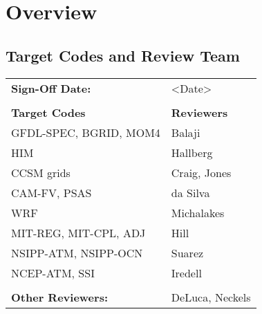 \chapter{\longname Overview}

\section{Target Codes and Review Team}

\begin{tabular}{l l}

{\bf Sign-Off Date:}          & <Date> \\ \\

{\bf Target Codes}            & {\bf Reviewers} \\
GFDL-SPEC, BGRID, MOM4        & Balaji \\ 
HIM                           & Hallberg \\
CCSM grids                    & Craig, Jones \\
CAM-FV, PSAS                  & da Silva\\
WRF                           & Michalakes \\
MIT-REG, MIT-CPL, ADJ         & Hill \\
NSIPP-ATM, NSIPP-OCN          & Suarez \\
NCEP-ATM, SSI                 & Iredell \\ \\

{\bf Other Reviewers:}        & DeLuca, Neckels

\end{tabular}


%



